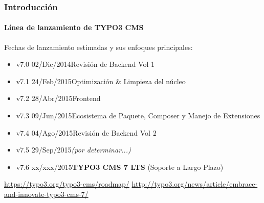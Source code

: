 \begin{frame}[fragile]
	\frametitle{Introducción}
	\framesubtitle{Línea de lanzamiento de TYPO3 CMS}

	Fechas de lanzamiento estimadas y sus enfoques principales:

	\begin{itemize}
		\item v7.0 \tabto{1.0cm}02/Dic/2014\tabto{3.4cm}Revisión de Backend Vol 1
		\item v7.1 \tabto{1.0cm}24/Feb/2015\tabto{3.4cm}Optimización \& Limpieza del núcleo

		\item
			\begingroup
				\color{typo3orange}
					v7.2 \tabto{1.0cm}28/Abr/2015\tabto{3.4cm}Frontend
			\endgroup

		\item v7.3 \tabto{1.0cm}09/Jun/2015\tabto{3.4cm}Ecosistema de Paquete, Composer\newline
			\tabto{3.4cm}y Manejo de Extensiones
		\item v7.4 \tabto{1.0cm}04/Ago/2015\tabto{3.4cm}Revisión de Backend Vol 2
		\item v7.5 \tabto{1.0cm}29/Sep/2015\tabto{3.4cm}\textit{(por determinar...)}
		\item v7.6 \tabto{1.0cm}xx/xxx/2015\tabto{3.4cm}\textbf{TYPO3 CMS 7 LTS} (Soporte a Largo Plazo)
	\end{itemize}

	\smaller
		\url{https://typo3.org/typo3-cms/roadmap/}\newline
		\url{http://typo3.org/news/article/embrace-and-innovate-typo3-cms-7/}
	\normalsize

\end{frame}

